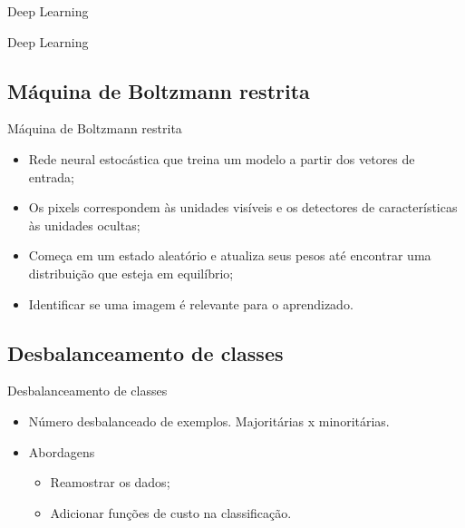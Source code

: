 \documentclass{beamer}
\begin{document}
\begin{frame}{Deep Learning}
\begin{frame}{Deep Learning}



\end{frame}
\subsection{Máquina de Boltzmann restrita}
\begin{frame}{Máquina de Boltzmann restrita}
\begin{itemize}
  \item Rede neural estocástica que treina um modelo a partir dos vetores de entrada;
  \item Os pixels correspondem às unidades visíveis e os detectores de características às unidades ocultas;
  \item Começa em um estado aleatório e atualiza seus pesos até encontrar uma distribuição que esteja em equilíbrio;
  \item Identificar se uma imagem é relevante para o aprendizado.
\end{itemize}

\end{frame}
\subsection{Desbalanceamento de classes}
\begin{frame}{Desbalanceamento de classes}
\begin{itemize}
  \item Número desbalanceado de exemplos. Majoritárias x minoritárias.
  \item Abordagens
    \begin{itemize}
        \item Reamostrar os dados;
        \item Adicionar funções de custo na classificação.
    \end{itemize}
\end{itemize}


\end{frame}
\end{frame}
\end{document}
